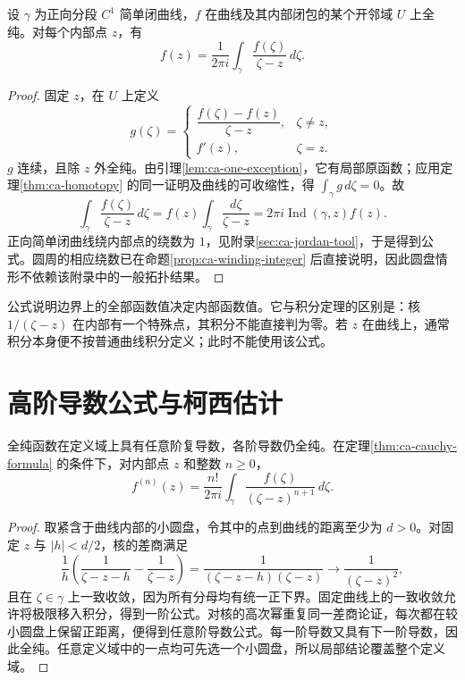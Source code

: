 \documentclass[UTF8,12pt,a4paper,fontset=fandol]{ctexbook}
\begin{document}
\begin{theorem}
\label{thm:ca-cauchy-formula}
设 $\gamma$ 为正向分段 $C^1$ 简单闭曲线，$f$ 在曲线及其内部闭包的某个开邻域 $U$ 上全纯。对每个内部点 $z$，有
\begin{equation}
  f(z)=\frac{1}{2\pi i}\int_\gamma\frac{f(\zeta)}{\zeta-z}\,d\zeta.
  \label{eq:ca-cauchy-formula}
\end{equation}
\end{theorem}
\begin{proof}
固定 $z$，在 $U$ 上定义
\[
 g(\zeta)=\begin{cases}
 \dfrac{f(\zeta)-f(z)}{\zeta-z},&\zeta\ne z,\\
 f'(z),&\zeta=z.
 \end{cases}
\]
$g$ 连续，且除 $z$ 外全纯。由引理\ref{lem:ca-one-exception}，它有局部原函数；应用定理\ref{thm:ca-homotopy} 的同一证明及曲线的可收缩性，得 $\int_\gamma g\,d\zeta=0$。故
\[
 \int_\gamma\frac{f(\zeta)}{\zeta-z}\,d\zeta
 =f(z)\int_\gamma\frac{d\zeta}{\zeta-z}
 =2\pi i\operatorname{Ind}(\gamma,z)f(z).
\]
正向简单闭曲线绕内部点的绕数为 $1$，见附录\ref{sec:ca-jordan-tool}，于是得到公式。圆周的相应绕数已在命题\ref{prop:ca-winding-integer} 后直接说明，因此圆盘情形不依赖该附录中的一般拓扑结果。
\end{proof}

公式说明边界上的全部函数值决定内部函数值。它与积分定理的区别是：核 $1/(\zeta-z)$ 在内部有一个特殊点，其积分不能直接判为零。若 $z$ 在曲线上，通常积分本身便不按普通曲线积分定义；此时不能使用该公式。

\section{高阶导数公式与柯西估计}

\begin{theorem}[高阶导数公式]
\label{thm:ca-higher-derivatives}
全纯函数在定义域上具有任意阶复导数，各阶导数仍全纯。在定理\ref{thm:ca-cauchy-formula} 的条件下，对内部点 $z$ 和整数 $n\ge0$，
\begin{equation}
 f^{(n)}(z)=\frac{n!}{2\pi i}\int_\gamma
                  \frac{f(\zeta)}{(\zeta-z)^{n+1}}\,d\zeta.
 \label{eq:ca-higher-cauchy}
\end{equation}
\end{theorem}
\begin{proof}
取紧含于曲线内部的小圆盘，令其中的点到曲线的距离至少为 $d>0$。对固定 $z$ 与 $|h|<d/2$，核的差商满足
\[
 \frac1h\left(\frac1{\zeta-z-h}-\frac1{\zeta-z}\right)
 =\frac1{(\zeta-z-h)(\zeta-z)}
 \longrightarrow\frac1{(\zeta-z)^2},
\]
且在 $\zeta\in\gamma$ 上一致收敛，因为所有分母均有统一正下界。固定曲线上的一致收敛允许将极限移入积分，得到一阶公式。对核的高次幂重复同一差商论证，每次都在较小圆盘上保留正距离，便得到任意阶导数公式。每一阶导数又具有下一阶导数，因此全纯。任意定义域中的一点均可先选一个小圆盘，所以局部结论覆盖整个定义域。
\end{proof}
\end{document}
